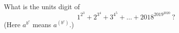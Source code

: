 What is the units digit of
\[
1^{2^3}+2^{3^4}+3^{4^5}+\dots+2018^{2019^{2020}}\,?
\]
(Here $a^{b^c}$ means $a^{(b^c)}$.)

